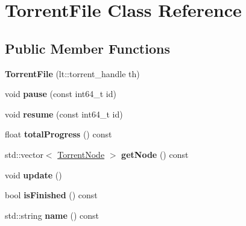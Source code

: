 \hypertarget{class_torrent_file}{}\section{Torrent\+File Class Reference}
\label{class_torrent_file}
\subsection*{Public Member Functions}
\begin{DoxyCompactItemize}
\item 
\mbox{\label{class_torrent_file_a27ce12d60a57cf1d96a11f8a0f577f10}} 
{\bfseries Torrent\+File} (lt\+::torrent\+\_\+handle th)
\item 
\mbox{\label{class_torrent_file_a6e6d855070b528ce105730cbc0978dd5}} 
void {\bfseries pause} (const int64\+\_\+t id)
\item 
\mbox{\label{class_torrent_file_a560df176eab6c5de04239bdfc543524c}} 
void {\bfseries resume} (const int64\+\_\+t id)
\item 
\mbox{\label{class_torrent_file_ad0ad60a81ee1c36ca141e0e567003a2d}} 
float {\bfseries total\+Progress} () const
\item 
\mbox{\label{class_torrent_file_a897f2b650fe0751f6f600da7b91554b7}} 
std\+::vector$<$ \hyperlink{struct_torrent_node}{Torrent\+Node} $>$ {\bfseries get\+Node} () const
\item 
\mbox{\label{class_torrent_file_addc6398cd278de5c1006243e69bc8939}} 
void {\bfseries update} ()
\item 
\mbox{\label{class_torrent_file_a2705d475c4d765e8c5f271d53749de38}} 
bool {\bfseries is\+Finished} () const
\item 
\mbox{\label{class_torrent_file_a24e7ea45aabbb85a63c9f52ca0124290}} 
std\+::string {\bfseries name} () const
\item 
\mbox{\label{class_torrent_file_acc06bd2ca7292b99f6293d71a48bd0ff}} 

\end{DoxyCompactItemize}
